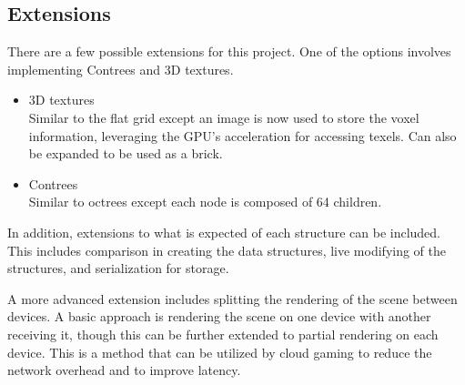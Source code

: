 \subsection*{Extensions}
There are a few possible extensions for this project.
One of the options involves implementing Contrees and 3D textures.

\begin{itemize}
  \item 3D textures \\
    Similar to the flat grid except an image is now used to store the
    voxel information, leveraging the GPU's acceleration for accessing texels.
    Can also be expanded to be used as a brick.
  \item Contrees \\
    Similar to octrees except each node is composed of 64 children.
\end{itemize}

In addition, extensions to what is expected of each structure can be
included. This includes comparison in creating the data structures,
live modifying of the structures, and serialization for storage.

A more advanced extension includes splitting the rendering of the scene between
devices. A basic approach is rendering the scene on one device with
another receiving it, though
this can be further extended to partial rendering on each device.
This is a method
that can be utilized by cloud gaming to reduce the network overhead
and to improve latency.
